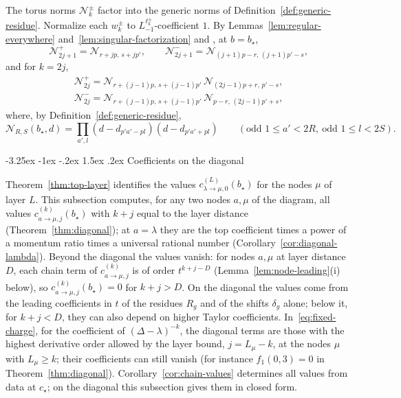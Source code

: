 \documentclass[twoside,10pt]{article}
\makeatletter
\numberwithin{equation}{section}
\theoremstyle{slbody}
\theoremstyle{definition}
\theoremstyle{remark}
\renewcommand{\subsection}{%
  \@startsection{subsection}{2}{\z@}%
    {-3.25ex \@plus -1ex \@minus -.2ex}%
    {1.5ex \@plus .2ex}%
    {\normalfont\normalsize\bfseries}}
\makeatother
\begin{document}
The torus norms \(\mathcal N^\pm_k\) factor into the generic norms of
Definition~\ref{def:generic-residue}.  Normalize each \(w^\pm_k\) to
\(L_{-1}^{\ell^\pm_k}\)-coefficient \(1\).  By
Lemmas~\ref{lem:regular-everywhere} and~\ref{lem:singular-factorization} and
\cite[Proposition~5.1]{IoharaKoga2011}, at \(b=b_\star\),
\[
 \mathcal N^+_{2j+1}={\mathcal N}_{r+jp,\,s+jp'},\qquad
 \mathcal N^-_{2j+1}={\mathcal N}_{(j+1)p-r,\,(j+1)p'-s},
\]
and for \(k=2j\),
\begin{gather*}
 \mathcal N^+_{2j}={\mathcal N}_{r+(j-1)p,\,s+(j-1)p'}\,{\mathcal N}_{(2j-1)p+r,\,p'-s},\\
 \mathcal N^-_{2j}={\mathcal N}_{r+(j-1)p,\,s+(j-1)p'}\,{\mathcal N}_{p-r,\,(2j-1)p'+s},
\end{gather*}
where, by Definition~\ref{def:generic-residue},
\[
 {\mathcal N}_{R,S}(b_\star,d)=\prod_{a',l}(d-d_{p'a'-pl})(d-d_{p'a'+pl})
 \qquad(\text{odd }1\leq a'<2R,\ \text{odd }1\leq l<2S).
\]

\subsection{Coefficients on the diagonal}\label{sec:diagonal}

Theorem~\ref{thm:top-layer} identifies the values
$c^{(L)}_{\lambda\to\mu,0}(b_\star)$ for the nodes $\mu$ of layer $L$.  This
subsection computes, for any two nodes $a,\mu$ of the diagram, all values
$c^{(k)}_{a\to\mu,j}(b_\star)$ with $k+j$ equal to the layer distance
(Theorem~\ref{thm:diagonal}); at $a=\lambda$ they are the top coefficient times
a power of a momentum ratio times a universal rational number
(Corollary~\ref{cor:diagonal-lambda}).  Beyond the diagonal the values vanish:
for nodes $a,\mu$ at layer distance $D$, each chain term of
$c^{(k)}_{a\to\mu,j}$ is of order $t^{k+j-D}$ (Lemma~\ref{lem:node-leading}(i)
below), so $c^{(k)}_{a\to\mu,j}(b_\star)=0$ for $k+j>D$.  On the diagonal the
values come from the leading coefficients in $t$ of the residues $R_g$ and of
the shifts $\delta_g$ alone; below it, for $k+j<D$, they can also depend on
higher Taylor coefficients.  In~\eqref{eq:fixed-charge}, for the coefficient of
$(\Delta-\lambda)^{-k}$, the diagonal terms are those with the highest
derivative order allowed by the layer bound, $j=L_\mu-k$, at the nodes $\mu$
with $L_\mu\geq k$; their coefficients can still vanish (for instance
$f_1(0,3)=0$ in Theorem~\ref{thm:diagonal}).
Corollary~\ref{cor:chain-values} determines all values from data at $c_\star$;
on the diagonal this subsection gives them in closed form.
\end{document}
